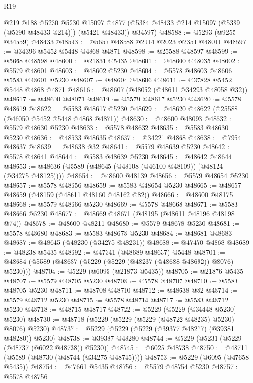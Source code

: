 \begin{lexlean}{R19}
\begin{coremodule}
        @219
        @188
        @5230
        @5230
        @15097
        @4877
        (@5384 @48433 @214 @15097 (@5389 (@5390 @48433 @214)))
        (@5421 @48433))
      @34597)
@48588 := @5293 (@9255 @34559) @48433
@48593 := @5657 @48588 @2014 @2023 @2351 @48011
@48597 := @34396 @5452 @5448 @4868 @4871
@48598 := @25588 @48597
@48599 := @5668 @48598
@48600 := @21831 @5435
@48601 := @48600 @48035
@48602 := @5579 @48601
@48603 := @48602 @5230
@48604 := @5578 @48603
@48606 := @5583 @48601 @5230
@48607 := @48604 @48606
@48611 := @37828 @5452 @5448 @4868 @4871
@48616 := @48607 (@48052 (@48611 @34293 @48058 @32))
@48617 := @48600 @48071
@48619 := @5579 @48617 @5230
@48620 := @5578 @48619
@48622 := @5583 @48617 @5230
@48629 := @48620 @48622 (@25588 (@46050 @5452 @5448 @4868 @4871))
@48630 := @48600 @48093
@48632 := @5579 @48630 @5230
@48633 := @5578 @48632
@48635 := @5583 @48630 @5230
@48636 := @48633 @48635
@48637 := @34221 @4868
@48638 := @7954 @48637
@48639 := @48638 @32
@48641 := @5579 @48639 @5230
@48642 := @5578 @48641
@48644 := @5583 @48639 @5230
@48645 := @48642 @48644
@48653 := @48636 (@5589 (@48645 (@48108 (@46100 @48109)) (@48124 (@34275 @48125))))
@48654 := @48600 @48139
@48656 := @5579 @48654 @5230
@48657 := @5578 @48656
@48659 := @5583 @48654 @5230
@48665 := @48657 @48659 (@48159 (@48611 @48160 @48162 @82))
@48666 := @48600 @48175
@48668 := @5579 @48666 @5230
@48669 := @5578 @48668
@48671 := @5583 @48666 @5230
@48677 := @48669 @48671 (@48195 (@48611 @48196 @48198 @74))
@48678 := @48600 @48211
@48680 := @5579 @48678 @5230
@48681 := @5578 @48680
@48683 := @5583 @48678 @5230
@48684 := @48681 @48683
@48687 := @48645 (@48230 (@34275 @48231))
@48688 := @47470 @4868
@48689 := @48238 @5435
@48692 := @47341 (@48689 @48637) @5448
@48701 := @48684 (@5589 (@48687 (@5229 (@5229 (@48237 (@48688 @48692)) @8076) @5230)))
@48704 := @5229 (@6095 (@21873 @5435))
@48705 := @21876 @5435
@48707 := @5579 @48705 @5230
@48708 := @5578 @48707
@48710 := @5583 @48705 @5230
@48711 := @48708 @48710
@48712 := @48638 @82
@48714 := @5579 @48712 @5230
@48715 := @5578 @48714
@48717 := @5583 @48712 @5230
@48718 := @48715 @48717
@48722 := @5229 (@5229 (@34448 @5230) @5230)
@48730 := @48718 (@5229 (@5229 (@5229 (@48722 @48235) @5230) @8076) @5230)
@48737 := @5229 (@5229 (@5229 (@39377 @48277) (@39381 @48280)) @5230)
@48738 := @39387 @48280
@48744 := @5229 (@5231 (@5229 (@48737 (@6022 @48738)) @5230))
@48745 := @6025 @48738
@48750 := @48711 (@5589 (@48730 (@48744 (@34275 @48745))))
@48753 := @5229 (@6095 (@47658 @5435))
@48754 := @47661 @5435
@48756 := @5579 @48754 @5230
@48757 := @5578 @48756

\end{coremodule}
\end{lexlean}
